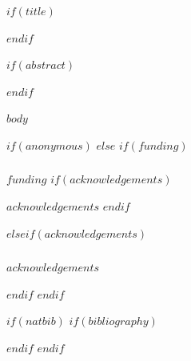 \documentclass[runningheads,envcountsame]{llncs}
\author{Anonymous submission}
\institute{}
\author{$for(authors)$$authors.name$$if(authors.orcid)$\orcidID{$authors.orcid$}$endif$$sep$ \and $endfor$}
\author{$for(author)$$author$$sep$ \and $endfor$}
\author{}
\institute{$institute$$if(email)$\\\email{$email$}$endif$}
\institute{$for(authors)$$authors.affiliation$$if(authors.email)$\\\email{$authors.email$}$endif$$sep$ \and $endfor$}
\institute{}
\begin{document}
$if(title)$\maketitle$endif$

$if(abstract)$
\begin{abstract}
$abstract$
$if(keywords)$
$endif$
\end{abstract}
$endif$

$body$

$if(anonymous)$
$else$
$if(funding)$
\begin{credits}
\subsubsection{\ackname}
$funding$
$if(acknowledgements)$

$acknowledgements$
$endif$
\end{credits}
$elseif(acknowledgements)$
\begin{credits}
\subsubsection{\ackname}
$acknowledgements$
\end{credits}
$endif$
$endif$

$if(natbib)$
$if(bibliography)$


$endif$
$endif$
\end{document}
